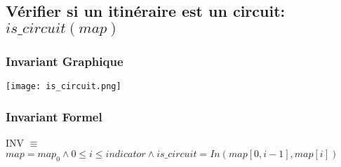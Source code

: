 \subsection{Vérifier si un itinéraire est un circuit: $is\_circuit(map)$}

\subsubsection{Invariant Graphique}

\addvspace{40px}
\begin{center}
    \texttt{[image: is\_circuit.png]}
\end{center}
\addvspace{40px}

\subsubsection{Invariant Formel}

INV $\equiv$ $map=map_0 \land 0 \le i \le indicator \land is\_circuit=In(map[0, i-1], map[i])$